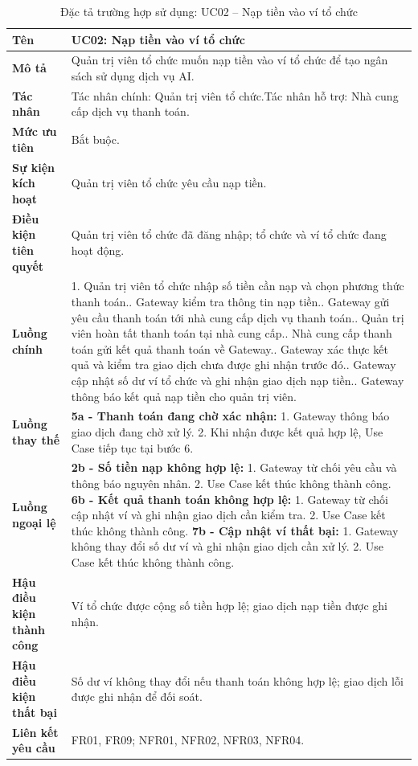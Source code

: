 \begin{longtable}{|L{4.2cm}|L{9.5cm}|}
\caption[Đặc tả UC02]{Đặc tả trường hợp sử dụng: UC02 -- Nạp tiền vào ví tổ chức} \\\hline
\textbf{Tên} & UC02: Nạp tiền vào ví tổ chức \\\hline
\textbf{Mô tả} & Quản trị viên tổ chức muốn nạp tiền vào ví tổ chức để tạo ngân sách sử dụng dịch vụ AI.\\\hline
\textbf{Tác nhân} & Tác nhân chính: Quản trị viên tổ chức.\newline Tác nhân hỗ trợ: Nhà cung cấp dịch vụ thanh toán.\\\hline
\textbf{Mức ưu tiên} & Bắt buộc.\\\hline
\textbf{Sự kiện kích hoạt} & Quản trị viên tổ chức yêu cầu nạp tiền.\\\hline
\textbf{Điều kiện tiên quyết} & Quản trị viên tổ chức đã đăng nhập; tổ chức và ví tổ chức đang hoạt động.\\\hline
\textbf{Luồng chính} &
1. Quản trị viên tổ chức nhập số tiền cần nạp và chọn phương thức thanh toán.. Gateway kiểm tra thông tin nạp tiền.. Gateway gửi yêu cầu thanh toán tới nhà cung cấp dịch vụ thanh toán.. Quản trị viên hoàn tất thanh toán tại nhà cung cấp.. Nhà cung cấp thanh toán gửi kết quả thanh toán về Gateway.. Gateway xác thực kết quả và kiểm tra giao dịch chưa được ghi nhận trước đó.. Gateway cập nhật số dư ví tổ chức và ghi nhận giao dịch nạp tiền.. Gateway thông báo kết quả nạp tiền cho quản trị viên.\\\hline
\textbf{Luồng thay thế} &
\textbf{5a - Thanh toán đang chờ xác nhận:} 1. Gateway thông báo giao dịch đang chờ xử lý. 2. Khi nhận được kết quả hợp lệ, Use Case tiếp tục tại bước 6.\\\hline
\textbf{Luồng ngoại lệ} &
\textbf{2b - Số tiền nạp không hợp lệ:} 1. Gateway từ chối yêu cầu và thông báo nguyên nhân. 2. Use Case kết thúc không thành công.\newline
\textbf{6b - Kết quả thanh toán không hợp lệ:} 1. Gateway từ chối cập nhật ví và ghi nhận giao dịch cần kiểm tra. 2. Use Case kết thúc không thành công.\newline
\textbf{7b - Cập nhật ví thất bại:} 1. Gateway không thay đổi số dư ví và ghi nhận giao dịch cần xử lý. 2. Use Case kết thúc không thành công.\\\hline
\textbf{Hậu điều kiện thành công} & Ví tổ chức được cộng số tiền hợp lệ; giao dịch nạp tiền được ghi nhận.\\\hline
\textbf{Hậu điều kiện thất bại} & Số dư ví không thay đổi nếu thanh toán không hợp lệ; giao dịch lỗi được ghi nhận để đối soát.\\\hline
\textbf{Liên kết yêu cầu} & FR01, FR09; NFR01, NFR02, NFR03, NFR04.\\\hline
\end{longtable}



